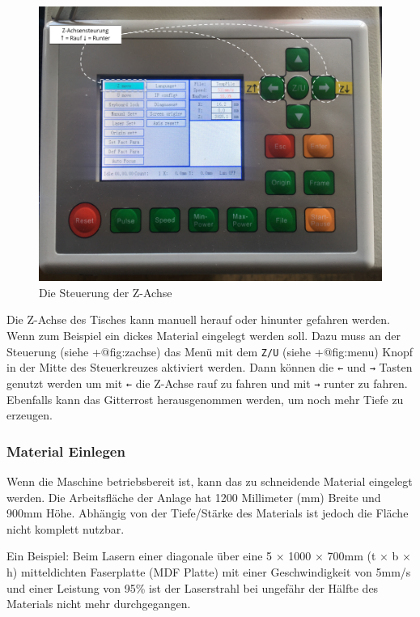 \documentclass[]{article}
\begin{document}
\begin{figure}
\hypertarget{fig:zachse}{%
\centering
\includegraphics{assets/images/laser-z-achse.png}
\caption{Die Steuerung der Z-Achse}\label{fig:zachse}
}
\end{figure}

Die Z-Achse des Tisches kann manuell herauf oder hinunter gefahren
werden. Wenn zum Beispiel ein dickes Material eingelegt werden soll.
Dazu muss an der Steuerung (siehe +@fig:zachse) das Menü mit dem
\texttt{Z/U} (siehe +@fig:menu) Knopf in der Mitte des Steuerkreuzes
aktiviert werden. Dann können die \texttt{←} und \texttt{→} Tasten
genutzt werden um mit \texttt{←} die Z-Achse rauf zu fahren und mit
\texttt{→} runter zu fahren. Ebenfalls kann das Gitterrost
herausgenommen werden, um noch mehr Tiefe zu erzeugen.

\hypertarget{material-einlegen}{%
\subsubsection{Material Einlegen}\label{material-einlegen}}

Wenn die Maschine betriebsbereit ist, kann das zu schneidende Material
eingelegt werden. Die Arbeitsfläche der Anlage hat 1200 Millimeter (mm)
Breite und 900mm Höhe. Abhängig von der Tiefe/Stärke des Materials ist
jedoch die Fläche nicht komplett nutzbar.

Ein Beispiel: Beim Lasern einer diagonale über eine 5 × 1000 × 700mm (t
× b × h) mitteldichten Faserplatte (MDF Platte) mit einer
Geschwindigkeit von 5mm/s und einer Leistung von 95\% ist der
Laserstrahl bei ungefähr der Hälfte des Materials nicht mehr
durchgegangen.
\end{document}
